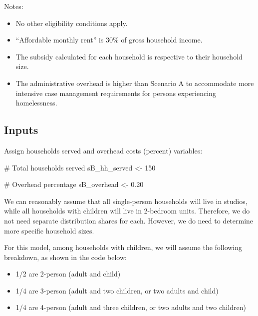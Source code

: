 \documentclass[
  10pt,
  letterpaper,
  DIV=11,
  numbers=noendperiod]{scrartcl}
\newenvironment{Shaded}{\begin{snugshade}}{\end{snugshade}}
\newcommand{\CommentTok}[1]{\textcolor[rgb]{0.37,0.37,0.37}{#1}}
\newcommand{\DecValTok}[1]{\textcolor[rgb]{0.68,0.00,0.00}{#1}}
\newcommand{\FloatTok}[1]{\textcolor[rgb]{0.68,0.00,0.00}{#1}}
\newcommand{\NormalTok}[1]{\textcolor[rgb]{0.00,0.23,0.31}{#1}}
\newcommand{\OtherTok}[1]{\textcolor[rgb]{0.00,0.23,0.31}{#1}}
\providecommand{\tightlist}{%
  \setlength{\itemsep}{0pt}\setlength{\parskip}{0pt}}\usepackage{longtable,booktabs,array}
\begin{document}
Notes:

\begin{itemize}
\tightlist
\item
  No other eligibility conditions apply.
\item
  ``Affordable monthly rent'' is 30\% of gross household income.
\item
  The subsidy calculated for each household is respective to their
  household size.
\item
  The administrative overhead is higher than Scenario A to accommodate
  more intensive case management requirements for persons experiencing
  homelessness.
\end{itemize}

\newpage

\subsection{Inputs}\label{inputs-1}

Assign households served and overhead costs (percent) variables:

\begin{Shaded}
\begin{Highlighting}[]
\CommentTok{\# Total households served}
\NormalTok{sB\_hh\_served }\OtherTok{\textless{}{-}} \DecValTok{150}

\CommentTok{\# Overhead percentage}
\NormalTok{sB\_overhead }\OtherTok{\textless{}{-}} \FloatTok{0.20}
\end{Highlighting}
\end{Shaded}

We can reasonably assume that all single-person households will live in
studios, while all households with children will live in 2-bedroom
units. Therefore, we do not need separate distribution shares for each.
However, we do need to determine more specific household sizes.

For this model, among households with children, we will assume the
following breakdown, as shown in the code below:

\begin{itemize}
\tightlist
\item
  1/2 are 2-person (adult and child)
\item
  1/4 are 3-person (adult and two children, or two adults and child)
\item
  1/4 are 4-person (adult and three children, or two adults and two
  children)
\end{itemize}
\end{document}
